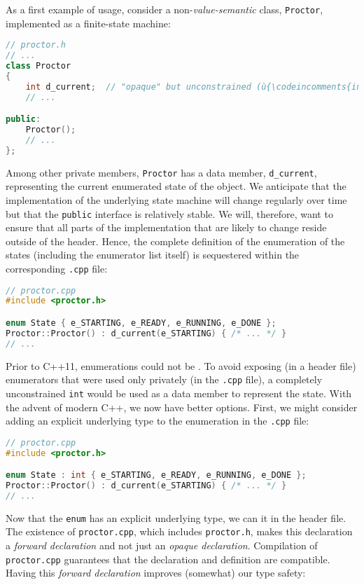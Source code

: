 As a first example of  usage, consider a
non-\emph{value-semantic}  class, \lstinline!Proctor!,
implemented as a finite-state machine:

\begin{lstlisting}[language=C++]
// proctor.h
// ...
class Proctor
{
    int d_current;  // "opaque" but unconstrained (ù{\codeincomments{int}}ù) type (BAD IDEA)
    // ...

public:
    Proctor();
    // ...
};
\end{lstlisting}

\noindent Among other private members, \lstinline!Proctor! has a data member,
\lstinline!d_current!, representing the current enumerated state of
the object. We anticipate that the implementation of the underlying
state machine will change regularly over time but that the
\lstinline!public! interface is relatively stable. We will, therefore, want
to ensure that all parts of the implementation that are likely to change
reside outside of the header. Hence, the complete definition of the
enumeration of the states (including the enumerator list itself) is
sequestered within the corresponding \lstinline!.cpp! file:

\begin{lstlisting}[language=C++]
// proctor.cpp
#include <proctor.h>

enum State { e_STARTING, e_READY, e_RUNNING, e_DONE };
Proctor::Proctor() : d_current(e_STARTING) { /* ... */ }
// ...
\end{lstlisting}

\noindent Prior to C++11, enumerations could not be . To
avoid exposing (in a header file) enumerators that were used only
privately (in the \lstinline!.cpp! file), a completely unconstrained
\lstinline!int! would be used as a data member to represent the state. With
the advent of modern C++, we now have better options. First, we might
consider adding an explicit underlying type to the enumeration in the
\lstinline!.cpp! file:

\begin{lstlisting}[language=C++]
// proctor.cpp
#include <proctor.h>

enum State : int { e_STARTING, e_READY, e_RUNNING, e_DONE };
Proctor::Proctor() : d_current(e_STARTING) { /* ... */ }
// ...
\end{lstlisting}

\noindent Now that the  \lstinline!enum! has an explicit
underlying type, we can  it in the header file.
The existence of \lstinline!proctor.cpp!, which includes
\lstinline!proctor.h!, makes this declaration a \emph{forward declaration}
and not just an \emph{opaque declaration}. Compilation of
\lstinline!proctor.cpp! guarantees that the declaration and definition are
compatible. Having this \emph{forward declaration} improves (somewhat)
our type safety:

